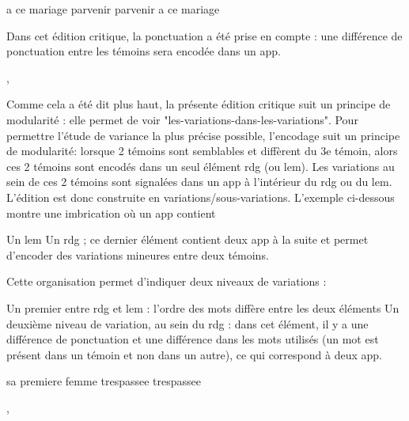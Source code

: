 \documentclass[12pt, a4paper]{article}
\begin{document}
                           
                              a ce mariage parvenir
                              parvenir a ce mariage
                           
                        
                     Dans cet édition critique, la ponctuation a été prise en compte : une différence de ponctuation entre les témoins sera encodée dans un app.
                        
                           
                              
                              ,
                           
                        
                     Comme cela a été dit plus haut, la présente édition critique suit un principe de modularité : elle permet de voir "les-variations-dans-les-variations".
                        Pour permettre l'étude de variance la plus précise possible, l'encodage suit un principe de modularité: lorsque 2 témoins sont semblables et diffèrent du 3e témoin, 
                        alors ces 2 témoins sont encodés dans un seul élément rdg (ou lem). Les variations au sein de ces 2 témoins sont signalées dans un app 
                        à l'intérieur du rdg ou du lem. L'édition est donc construite en variations/sous-variations. L'exemple ci-dessous montre une imbrication où un app contient 
                        
                           Un lem
                            Un rdg ; ce dernier élément contient deux app à la suite et permet d'encoder des variations mineures entre deux témoins.
                        
                        Cette organisation permet d'indiquer deux  niveaux de variations : 
                        
                           Un premier entre rdg et lem : l'ordre des mots diffère entre les deux éléments
                           Un deuxième niveau de variation, au sein du rdg : dans cet élément, il y a une différence de ponctuation et une différence dans les mots utilisés (un mot est
                              présent dans un témoin et non dans un autre), ce qui correspond à deux app.
                        
                        
                           
                              sa premiere femme trespassee
                              trespassee
                                 
                                    ,
                                    
\end{document}
